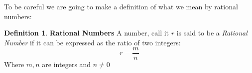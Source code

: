 \documentclass{amsart}
\numberwithin{equation}{section}
\theoremstyle{plain} %
\theoremstyle{definition}
\newtheorem{defn}[equation]{Definition}
\theoremstyle{remark}
\begin{document}
To be careful we are going to make a definition of what we mean by rational numbers:

\begin{defn}{\textbf{Rational Numbers}}
	A number, call it $r$ is said to be a \emph{Rational Number} if it can be expressed as the ratio of two integers:
	\[
	r = \frac{m}{n} 	
	\]
	Where $m,n$ are integers and $n\neq 0$
\end{defn}


% 

\end{document}
